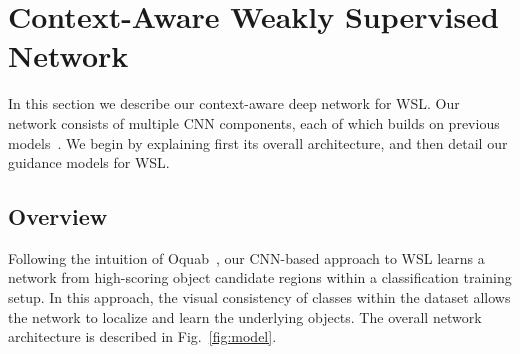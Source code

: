 \section{Context-Aware Weakly Supervised Network}

In this section we describe our context-aware deep network for WSL.  Our network
consists of multiple CNN components, each of which builds on previous
models~\cite{Oquab:2015us,Girshick_2015_ICCV,Bilen:2015uo,Gidaris:2015cx}. We
begin by explaining first its overall architecture, and then detail our guidance
models for WSL.


\subsection{Overview}

Following the intuition of
Oquab~\etal\cite{Oquab:2015us}, our CNN-based approach to WSL learns a network from high-scoring object
candidate regions within a classification training setup. In this approach, the
visual consistency of classes within the dataset allows the network to localize
and learn the underlying objects. The overall network architecture is described
in Fig.~\ref{fig:model}.

